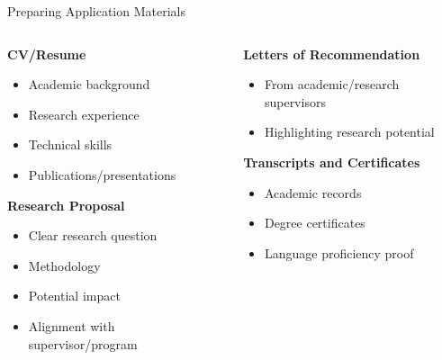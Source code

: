 \documentclass[aspectratio=169,10pt]{beamer}
\begin{document}
\begin{frame}{Preparing Application Materials}
    \begin{columns}[T]
        \begin{column}{0.5\textwidth}
            \textbf{CV/Resume}
            \begin{itemize}
                \item Academic background
                \item Research experience
                \item Technical skills
                \item Publications/presentations
            \end{itemize}
            
            \textbf{Research Proposal}
            \begin{itemize}
                \item Clear research question
                \item Methodology
                \item Potential impact
                \item Alignment with supervisor/program
            \end{itemize}
        \end{column}
        \begin{column}{0.5\textwidth}
            \textbf{Letters of Recommendation}
            \begin{itemize}
                \item From academic/research supervisors
                \item Highlighting research potential
            \end{itemize}
            
            \textbf{Transcripts and Certificates}
            \begin{itemize}
                \item Academic records
                \item Degree certificates
                \item Language proficiency proof
            \end{itemize}
        \end{column}
    \end{columns}
\end{frame}
\end{document}
